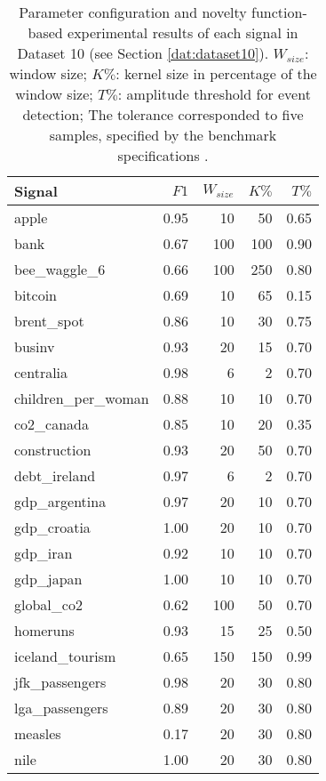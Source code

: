\begin{table}[H]
\centering
    \caption{Parameter configuration and novelty function-based experimental results of each signal in Dataset 10 (see Section \ref{dat:dataset10}). $W_{size}$: window size; $K\%$: kernel size in percentage of the window size; $T\%$: amplitude threshold for event detection; The tolerance corresponded to five samples, specified by the benchmark specifications \cite{cpd_alan}.}
    \label{tab:params_results_alanT}
    \begin{tabular}{lrrrr}
    \toprule
    Signal &     $F1$ &    $W_{size}$ &    $K\%$ &     $T\%$\\
    \midrule
    apple &  0.95 &   10 &   50 &  0.65 \\
    bank &  0.67 &  100 &  100 &  0.90 \\
    bee\_waggle\_6 &  0.66 &  100 &  250 &  0.80 \\
    bitcoin &  0.69 &   10 &   65 &  0.15 \\
    brent\_spot &  0.86 &   10 &   30 &  0.75 \\
    businv &  0.93 &   20 &   15 &  0.70 \\
    centralia &  0.98 &    6 &    2 &  0.70 \\
    children\_per\_woman &  0.88 &   10 &   10 &  0.70 \\
    co2\_canada &  0.85 &   10 &   20 &  0.35 \\
    construction &  0.93 &   20 &   50 &  0.70 \\
    debt\_ireland &  0.97 &    6 &    2 &  0.70 \\
    gdp\_argentina &  0.97 &   20 &   10 &  0.70 \\
    gdp\_croatia &  1.00 &   20 &   10 &  0.70 \\
    gdp\_iran &  0.92 &   10 &   10 &  0.70 \\
    gdp\_japan &  1.00 &   10 &   10 &  0.70 \\
    global\_co2 &  0.62 &  100 &   50 &  0.70 \\
    homeruns &  0.93 &   15 &   25 &  0.50 \\
    iceland\_tourism &  0.65 &  150 &  150 &  0.99 \\
    jfk\_passengers &  0.98 &   20 &   30 &  0.80 \\
    lga\_passengers &  0.89 &   20 &   30 &  0.80 \\
    measles &  0.17 &   20 &   30 &  0.80 \\
    nile &  1.00 &   20 &   30 &  0.80 \\

\end{tabular}
\end{table}

